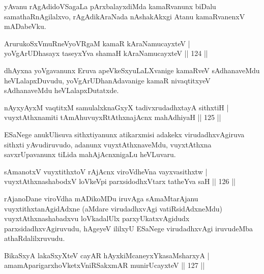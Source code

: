 \begin{artha}
yAvanu rAgAdidoVSagaLa pArxbalayxdiMda kamaRvanunx biDalu samathaRnAgilalxvo, rAgAdikAraNada nAshakAkxgi Atanu kamaRvanenxV mADabeVku.
\end{artha}


\begin{shl}
ArurukoSxVmuRneVyoVRgaM kamaR kAraNamucayxteV |\\
yoVgArUDhasayx taseyxYva shamaH kAraNamucayxteV \hfill || 124 ||
\end{shl}

\begin{artha}%
dhAyxna yoVgavanunx Eruva apeVkeSxyuLaLXvanige kamaRveV sAdhanaveMdu heVLalapxDuvudu, yoVgArUDhanAdavanige kamaR nivaqtitxyeV sAdhanaveMdu heVLalapxDutatxde.
\end{artha}

\begin{shl}
nAyxyAyxM vaqtitxM samulalxknaGxyX tadivxrudadhxtayA sithxtiH |\\
vuyxtAthxnamiti tAmAhuvuyxRtAthxnajAcnx mahAdhiyaH \hfill || 125 ||
\end{shl}

\begin{artha}
ESaNege anukUlisuva sithxtiyanunx atikarxmisi adakekx virudadhxvAgiruva sithxti yAvudiruvudo, adanunx vuyxtAthxnaveMdu, vuyxtAthxna savxrUpavanunx tiLida mahAjAcnxnigaLu heVLuvaru.
\end{artha}


\begin{shl}
sAmanotxV  vuyxtithxtoV rAjAcnx viroVdheVna vayxvasithxtw |\\
vuyxtAthxnashabodxV loVkeV\s pi parxsidodhxV\s tarx tatheYva saH \hfill || 126 ||
\end{shl}

\begin{artha}
rAjanoDane viroVdha mADikoMDu iruvAga sAmaMtarAjanu vuyxtithxtanAgidAdxne (aMdare virudadhxvAgi vatiRsidAdxneMdu) vuyxtAthxnashabadxvu loVkadalUlx parxyUkatxvAgidudx parxsidadhxvAgiruvudu, hAgeyeV ililxyU ESaNege virudadhxvAgi iruvudeMba athaRdalilxruvudu.
\end{artha}


\begin{shl}
BikaSxyA lakaSxyXteV cayAR hAyxkiMcaneyxYkasaMsharxyA |\\
amamAparigarxhoVketxVniRSakxmAR munirUcayxteV \hfill || 127 ||
\end{shl}

